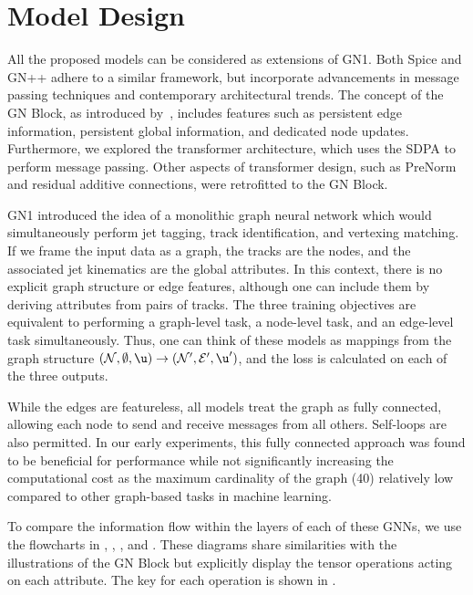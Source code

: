 \section{Model Design}

All the proposed models can be considered as extensions of GN1.
Both Spice and GN++ adhere to a similar framework, but incorporate advancements in message passing techniques and contemporary architectural trends.
The concept of the GN Block, as introduced by~\textcite{RelationalInductiveBiases}, includes features such as persistent edge information, persistent global information, and dedicated node updates.
Furthermore, we explored the transformer architecture, which uses the SDPA to perform message passing.
Other aspects of transformer design, such as PreNorm and residual additive connections, were retrofitted to the GN Block.

GN1 introduced the idea of a monolithic graph neural network which would simultaneously perform jet tagging, track identification, and vertexing matching.
If we frame the input data as a graph, the tracks are the nodes, and the associated jet kinematics are the global attributes.
In this context, there is no explicit graph structure or edge features, although one can include them by deriving attributes from pairs of tracks.
The three training objectives are equivalent to performing a graph-level task, a node-level task, and an edge-level task simultaneously.
Thus, one can think of these models as mappings from the graph structure $(\mathcal{N}, \emptyset, \u) \rightarrow (\mathcal{N}', \mathcal{E}', \u')$, and the loss is calculated on each of the three outputs.

While the edges are featureless, all models treat the graph as fully connected, allowing each node to send and receive messages from all others.
Self-loops are also permitted.
In our early experiments, this fully connected approach was found to be beneficial for performance while not significantly increasing the computational cost as the maximum cardinality of the graph (40) relatively low compared to other graph-based tasks in machine learning.

To compare the information flow within the layers of each of these GNNs, we use the flowcharts in , , , and .
These diagrams share similarities with the illustrations of the GN Block  but explicitly display the tensor operations acting on each attribute.
The key for each operation is shown in .


